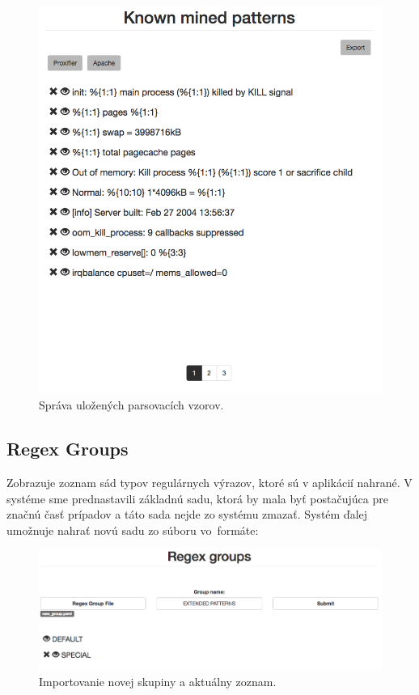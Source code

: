 \begin{figure}[htbp]
 \centering 
 \begin{minipage}{0.95\linewidth}
 	\centering
 	\includegraphics[width=\textwidth]{Images/thesis-pattern.png}
 \end{minipage}
  \caption{Správa uložených parsovacích vzorov.}
  \label{fig:pattern}
\end{figure}

\subsection{Regex Groups}
Zobrazuje zoznam sád typov regulárnych výrazov, ktoré sú v aplikácií nahrané. V systéme sme prednastavili základnú sadu, ktorá by mala byť postačujúca pre značnú časť prípadov a táto sada nejde zo systému zmazať. Systém ďalej umožnuje nahrať novú sadu zo súboru vo~formáte:

 \begin{figure}[htbp]
 \centering 
 \begin{minipage}{0.95\linewidth}
 	\centering
 	\includegraphics[width=\textwidth]{Images/thesis-groups.png}
 \end{minipage}
  \caption{Importovanie novej skupiny a aktuálny zoznam.}
  \label{fig:groups}
\end{figure}
